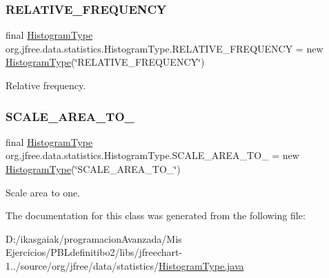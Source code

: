 \subsubsection{\texorpdfstring{R\+E\+L\+A\+T\+I\+V\+E\+\_\+\+F\+R\+E\+Q\+U\+E\+N\+CY}{RELATIVE\_FREQUENCY}}
{\footnotesize\ttfamily final \mbox{\hyperlink{classorg_1_1jfree_1_1data_1_1statistics_1_1_histogram_type}{Histogram\+Type}} org.\+jfree.\+data.\+statistics.\+Histogram\+Type.\+R\+E\+L\+A\+T\+I\+V\+E\+\_\+\+F\+R\+E\+Q\+U\+E\+N\+CY = new \mbox{\hyperlink{classorg_1_1jfree_1_1data_1_1statistics_1_1_histogram_type}{Histogram\+Type}}(\char`\"{}R\+E\+L\+A\+T\+I\+V\+E\+\_\+\+F\+R\+E\+Q\+U\+E\+N\+CY\char`\"{})\hspace{0.3cm}{\ttfamily [static]}}

Relative frequency. \mbox{\label{classorg_1_1jfree_1_1data_1_1statistics_1_1_histogram_type_a6b7db4bc5397a81b538e2931bf060135}} 
\subsubsection{\texorpdfstring{S\+C\+A\+L\+E\+\_\+\+A\+R\+E\+A\+\_\+\+T\+O\+\_}{SCALE\_AREA\_TO\_1}}
{\footnotesize\ttfamily final \mbox{\hyperlink{classorg_1_1jfree_1_1data_1_1statistics_1_1_histogram_type}{Histogram\+Type}} org.\+jfree.\+data.\+statistics.\+Histogram\+Type.\+S\+C\+A\+L\+E\+\_\+\+A\+R\+E\+A\+\_\+\+T\+O\+\_ = new \mbox{\hyperlink{classorg_1_1jfree_1_1data_1_1statistics_1_1_histogram_type}{Histogram\+Type}}(\char`\"{}S\+C\+A\+L\+E\+\_\+\+A\+R\+E\+A\+\_\+\+T\+O\+\_\char`\"{})\hspace{0.3cm}{\ttfamily [static]}}

Scale area to one. 

The documentation for this class was generated from the following file\+:\begin{DoxyCompactItemize}
\item 
D\+:/ikasgaiak/programacion\+Avanzada/\+Mis Ejercicios/\+P\+B\+Ldefinitibo2/libs/jfreechart-\/1../source/org/jfree/data/statistics/\mbox{\hyperlink{_histogram_type_8java}{Histogram\+Type.\+java}}\end{DoxyCompactItemize}
